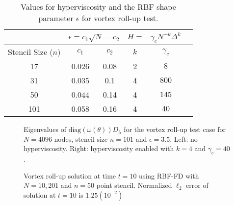 \begin{table}[t]
\caption{Values for hyperviscosity and the RBF shape parameter $\epsilon$ for vortex roll-up test.}
\begin{center}
\begin{tabular}{|c|c|c|c|c|c|}
\hline		     & \multicolumn{2}{c|}{$\epsilon = c_1 \sqrt{N} - c_2$} & \multicolumn{2}{c|}{$H = -\gamma_{c} N^{-k} \Delta^{k}$ } \\ \hline
Stencil Size ($n$) & $c_{1}$ & $c_{2}$ & $k$ & $\gamma_c$ \\ \hline
17 & 0.026 & 0.08 & 2 & $8$ \\
31 & 0.035 & 0.1  & 4 & $800$ \\
50 & 0.044 & 0.14 & 4 & $145$ \\
101 & 0.058 & 0.16 & 4 & $40$ \\ \hline
\end{tabular}
\end{center}
\label{tbl:vortex_hv_params}
\end{table}



\begin{figure}[htb]
\begin{center}
\caption{Eigenvalues of $\text{diag}(\omega(\theta)) D_\lambda$ for the vortex roll-up test case for $N=4096$ nodes, stencil size $n=101$ and $\epsilon = 3.5$. Left: no hyperviscosity. Right: hyperviscosity enabled with $k=4$ and $\gamma_c = 40$.%
}
\label{fig:eig_vortex}
\end{center}
\end{figure}

\begin{figure}[htbp]
\begin{center}
\caption{Vortex roll-up solution at time $t=10$ using RBF-FD with $N=10,201$ and $n=50$ point stencil. Normalized $\ell_2$ error of solution at $t=10$ is $1.25(10^{-2})$ }
\label{fig:vortex_t10}
\end{center}
\end{figure}

